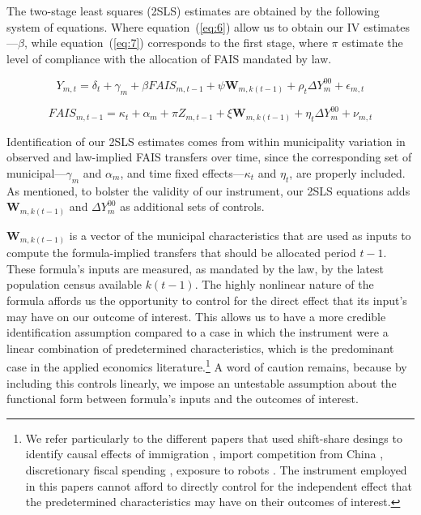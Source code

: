 \documentclass[dv_diss_main.tex]{subfiles}
\begin{document}
The two-stage least squares (2SLS) estimates are obtained by the following system of equations. Where equation~(\ref{eq:6}) allow us to obtain our IV estimates---$\beta$, while  equation~(\ref{eq:7}) corresponds to the first stage, where $\pi$ estimate the level of compliance with the allocation of FAIS mandated by law. 

\begin{equation} \label{eq:6}
Y_{m,t}=\delta_t + \gamma_m + \beta FAIS_{m,t-1} + \psi \textbf{W}_{m,k(t-1)} + \rho_t \Delta Y_m^{00} + \epsilon_{m,t}
\end{equation}

\begin{equation}\label{eq:7}
FAIS_{m,t-1}=\kappa_t + \alpha_m + \pi Z_{m,t-1} + \xi \textbf{W}_{m,k(t-1)} + \eta_t \Delta Y_m^{00} + \nu_{m,t}
\end{equation}

\noindent Identification of our 2SLS estimates comes from within municipality variation in observed and law-implied FAIS transfers over time, since the corresponding set of municipal---$\gamma_m$ and $\alpha_m$, and time fixed effects---$\kappa_t$ and $\eta_t$,  are properly included. As mentioned, to bolster the validity of our instrument, our 2SLS equations adds  $\textbf{W}_{m,k(t-1)}$ and $\Delta Y_m^{00}$ as additional sets of controls. 

 $\textbf{W}_{m,k(t-1)}$ is a vector of the municipal characteristics that are used as inputs to compute the formula-implied transfers that should be allocated period $t - 1$. These formula's inputs are measured, as mandated by the law, by the latest population census available $k(t -1)$. The highly nonlinear nature of the formula affords us the opportunity to control for the direct effect that its input's may have on our outcome of interest. This allows us to have a more credible identification assumption compared to a case in which the instrument were  a linear combination of predetermined characteristics, which is the predominant case in the applied economics literature.\footnote{We refer particularly to the different papers that used shift-share desings to identify causal effects of immigration \citep{tabellini2020gifts}, import competition from China \citep{dell2019violent}, discretionary fiscal spending \cite{chodorow2012does}, exposure to robots \cite{acemoglu2020robots}. The instrument employed in this papers cannot afford to directly control for the independent effect that the predetermined characteristics may have on their outcomes of interest.} A word of caution remains, because by including this controls linearly, we impose an untestable assumption about the functional form between formula’s inputs and the outcomes of interest.
\end{document}
